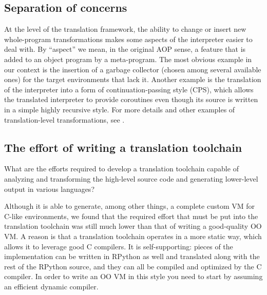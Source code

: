 \documentclass{llncs}
\begin{document}
\subsection{Separation of concerns}

At the level of the translation framework, the ability to change or
insert new whole-program transformations makes some aspects of the
interpreter easier to deal with.  By ``aspect'' we mean, in the original
AOP sense, a feature that is added to an object program by a
meta-program.  The most obvious example in our context is the insertion
of a garbage collector (chosen among several available ones) for the
target environments that lack it.  Another example is the translation of
the interpreter into a form of continuation-passing style (CPS), which
allows the translated interpreter to provide coroutines even though its
source is written in a simple highly recursive style.  For more details
and other examples of translation-level transformations, see
\cite{D07.1}.


\subsection{The effort of writing a translation toolchain}

What are the efforts required to develop a translation toolchain capable
of analyzing and transforming the high-level source code and generating
lower-level output in various languages?

Although it is able to generate, among other things, a complete custom
VM for C-like environments, we found that the required effort that must
be put into the translation toolchain was still much lower than that of
writing a good-quality OO VM.  A reason is that a translation toolchain
operates in a more static way, which allows it to leverage good C
compilers.  It is self-supporting: pieces of the implementation can be
written in RPython as well and translated along with the rest of the
RPython source, and they can all be compiled and optimized by the C
compiler.  In order to write an OO VM in this style you need to start by
assuming an efficient dynamic compiler.
\end{document}
